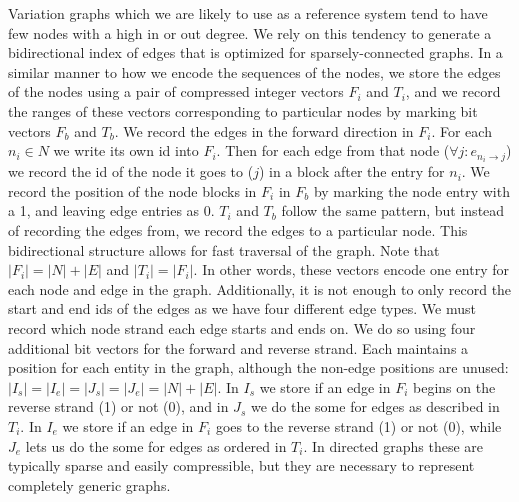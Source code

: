 \documentclass{article}
\begin{document}
Variation graphs which we are likely to use as a reference system tend to have few nodes with a high in or out degree.
We rely on this tendency to generate a bidirectional index of edges that is optimized for sparsely-connected graphs.
In a similar manner to how we encode the sequences of the nodes, we store the edges of the nodes using a pair of  compressed integer vectors $F_i$ and $T_i$, and we record the ranges of these vectors corresponding to particular nodes by marking bit vectors $F_b$ and $T_b$.
We record the edges in the forward direction in $F_i$.
For each $n_i \in N$ we write its own id into $F_i$.
Then for each edge from that node ($\forall j : e_{n_i \rightarrow j}$) we record the id of the node it goes to ($j$) in a block after the entry for $n_i$.
We record the position of the node blocks in $F_i$ in $F_b$ by marking the node entry with a 1, and leaving edge entries as 0.
$T_i$ and $T_b$ follow the same pattern, but instead of recording the edges from, we record the edges to a particular node.
This bidirectional structure allows for fast traversal of the graph.
Note that $|F_i| = |N| + |E|$ and $|T_i| = |F_i|$. In other words, these vectors encode one entry for each node and edge in the graph.
Additionally, it is not enough to only record the start and end ids of the edges as we have four different edge types.
We must record which node strand each edge starts and ends on.
We do so using four additional bit vectors for the forward and reverse strand.
Each maintains a position for each entity in the graph, although the non-edge positions are unused: $|I_s| = |I_e| = |J_s| = |J_e| = |N| + |E|$.
In $I_s$ we store if an edge in $F_i$ begins on the reverse strand (1) or not (0), and in $J_s$ we do the some for edges as described in $T_i$.
In $I_e$ we store if an edge in $F_i$ goes to the reverse strand (1) or not (0), while $J_e$ lets us do the some for edges as ordered in $T_i$.
In directed graphs these are typically sparse and easily compressible, but they are necessary to represent completely generic graphs.
\end{document}

